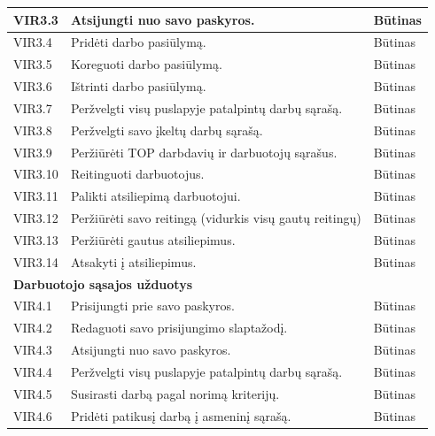\documentclass{VUMIFPSkursinis}
\begin{document}
\begin{table}[H]
\centering
\normalsize
\begin{tabular}{|p{2cm}|p{10cm}|p{3cm}|}
\hline
VIR3.3 & \multicolumn{1}{m{10cm}|}{Atsijungti nuo savo paskyros.} & Būtinas \\ \hline
VIR3.4 & \multicolumn{1}{m{10cm}|}{Pridėti darbo pasiūlymą.} & Būtinas \\ \hline
VIR3.5 & \multicolumn{1}{m{10cm}|}{Koreguoti darbo pasiūlymą.} & Būtinas \\ \hline
VIR3.6 & \multicolumn{1}{m{10cm}|}{Ištrinti darbo pasiūlymą.} & Būtinas \\ \hline
VIR3.7 & \multicolumn{1}{m{10cm}|}{Peržvelgti visų puslapyje patalpintų darbų sąrašą.} & Būtinas \\ \hline
VIR3.8 & \multicolumn{1}{m{10cm}|}{Peržvelgti savo įkeltų darbų sąrašą.} & Būtinas \\ \hline
VIR3.9 & \multicolumn{1}{m{10cm}|}{Peržiūrėti TOP darbdavių ir darbuotojų sąrašus.} & Būtinas \\ \hline
VIR3.10 & \multicolumn{1}{m{10cm}|}{Reitinguoti darbuotojus.} & Būtinas \\ \hline
VIR3.11 & \multicolumn{1}{m{10cm}|}{Palikti atsiliepimą darbuotojui.} & Būtinas \\ \hline
VIR3.12 & \multicolumn{1}{m{10cm}|}{Peržiūrėti savo reitingą (vidurkis visų gautų reitingų)} & Būtinas \\ \hline
VIR3.13 & \multicolumn{1}{m{10cm}|}{Peržiūrėti gautus atsiliepimus.} & Būtinas \\ \hline
VIR3.14 & \multicolumn{1}{m{10cm}|}{Atsakyti į atsiliepimus.} & Būtinas \\ \hline
\multicolumn{3}{|l|}{\textbf{Darbuotojo sąsajos užduotys }} \\ \hline
VIR4.1 & \multicolumn{1}{m{10cm}|}{Prisijungti prie savo paskyros.} & Būtinas \\ \hline
VIR4.2 & \multicolumn{1}{m{10cm}|}{Redaguoti savo prisijungimo slaptažodį.} & Būtinas \\ \hline
VIR4.3 & \multicolumn{1}{m{10cm}|}{Atsijungti nuo savo paskyros.} & Būtinas \\ \hline
VIR4.4 & \multicolumn{1}{m{10cm}|}{Peržvelgti visų puslapyje patalpintų darbų sąrašą.} & Būtinas \\ \hline
VIR4.5 & \multicolumn{1}{m{10cm}|}{Susirasti darbą pagal norimą kriterijų.} & Būtinas \\ \hline
VIR4.6 & \multicolumn{1}{m{10cm}|}{Pridėti patikusį darbą į asmeninį sąrašą.} & Būtinas \\ \hline

\end{tabular}
\end{table}
\end{document}
